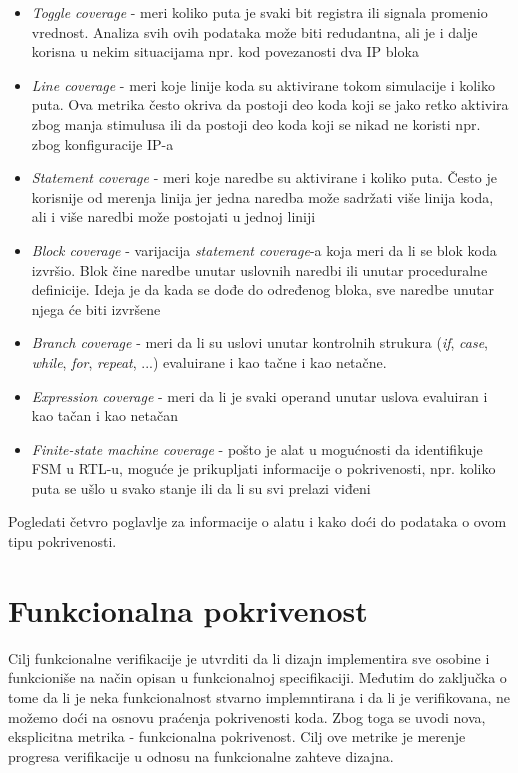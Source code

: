 \begin{itemize}
\item \emph{Toggle coverage} - meri koliko puta je svaki bit registra ili
  signala promenio vrednost. Analiza svih ovih podataka može biti redudantna,
  ali je i dalje korisna u nekim situacijama npr. kod povezanosti dva IP bloka
\item \emph{Line coverage} - meri koje linije koda su aktivirane tokom
  simulacije i koliko puta. Ova metrika često okriva da postoji deo koda koji se
  jako retko aktivira zbog manja stimulusa ili da postoji deo koda koji se nikad
  ne koristi npr. zbog konfiguracije IP-a
\item \emph{Statement coverage} - meri koje naredbe su aktivirane i koliko puta.
  Često je korisnije od merenja linija jer jedna naredba može sadržati više
  linija koda, ali i više naredbi može postojati u jednoj liniji
\item \emph{Block coverage} - varijacija \emph{statement coverage}-a koja meri
  da li se blok koda izvršio. Blok čine naredbe unutar uslovnih naredbi ili
  unutar proceduralne definicije. Ideja je da kada se dođe do određenog bloka,
  sve naredbe unutar njega će biti izvršene
\item \emph{Branch coverage} - meri da li su uslovi unutar kontrolnih strukura
  (\emph{if}, \emph{case}, \emph{while}, \emph{for}, \emph{repeat}, ...)
  evaluirane i kao tačne i kao netačne.
\item \emph{Expression coverage} - meri da li je svaki operand unutar uslova
  evaluiran i kao tačan i kao netačan
\item \emph{Finite-state machine coverage} - pošto je alat u mogućnosti da
  identifikuje FSM u RTL-u, moguće je prikupljati informacije o pokrivenosti,
  npr. koliko puta se ušlo u svako stanje ili da li su svi prelazi viđeni
\end{itemize}

Pogledati četvro poglavlje za informacije o alatu i kako doći do podataka o ovom
tipu pokrivenosti.


\section{Funkcionalna pokrivenost}

Cilj funkcionalne verifikacije je utvrditi da li dizajn implementira sve osobine
i funkcioniše na način opisan u funkcionalnoj specifikaciji. Međutim do
zaključka o tome da li je neka funkcionalnost stvarno implemntirana i da li je
verifikovana, ne možemo doći na osnovu praćenja pokrivenosti koda. Zbog toga se
uvodi nova, eksplicitna metrika - funkcionalna pokrivenost. Cilj ove metrike je
merenje progresa verifikacije u odnosu na funkcionalne zahteve dizajna.\\

